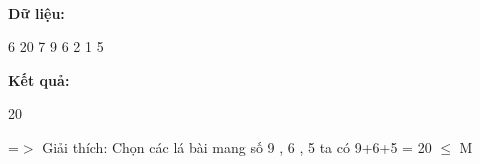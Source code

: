  
 

\textbf{Dữ liệu: }

6 20 7 9 6 2 1 5

\textbf{Kết quả: }

20

=$>$ Giải thích: Chọn các lá bài mang số 9 , 6 , 5 ta có 9+6+5 = 20  $\le$  M